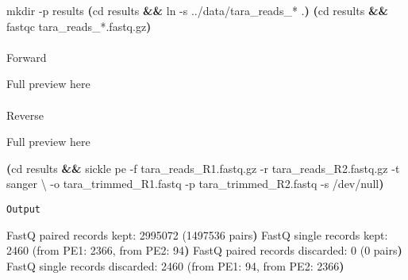 \documentclass[
  letterpaper,
  DIV=11,
  numbers=noendperiod]{scrartcl}
\makeatletter
\let\oldparagraph\paragraph
\renewcommand{\paragraph}{
    \@ifstar
      \xxxParagraphStar
      \xxxParagraphNoStar
  }
\newcommand{\xxxParagraphStar}[1]{\oldparagraph*{#1}\mbox{}}
\newcommand{\xxxParagraphNoStar}[1]{\oldparagraph{#1}\mbox{}}
\newenvironment{Shaded}{\begin{snugshade}}{\end{snugshade}}
\newcommand{\AttributeTok}[1]{\textcolor[rgb]{0.40,0.45,0.13}{#1}}
\newcommand{\BuiltInTok}[1]{\textcolor[rgb]{0.00,0.23,0.31}{#1}}
\newcommand{\DataTypeTok}[1]{\textcolor[rgb]{0.68,0.00,0.00}{#1}}
\newcommand{\ErrorTok}[1]{\textcolor[rgb]{0.68,0.00,0.00}{#1}}
\newcommand{\ExtensionTok}[1]{\textcolor[rgb]{0.00,0.23,0.31}{#1}}
\newcommand{\FunctionTok}[1]{\textcolor[rgb]{0.28,0.35,0.67}{#1}}
\newcommand{\KeywordTok}[1]{\textcolor[rgb]{0.00,0.23,0.31}{\textbf{#1}}}
\newcommand{\NormalTok}[1]{\textcolor[rgb]{0.00,0.23,0.31}{#1}}
\newcommand{\PreprocessorTok}[1]{\textcolor[rgb]{0.68,0.00,0.00}{#1}}
\makeatother
\begin{document}
\begin{Shaded}
\begin{Highlighting}[]
\FunctionTok{mkdir} \AttributeTok{{-}p}\NormalTok{ results}
\KeywordTok{(}\BuiltInTok{cd}\NormalTok{ results }\KeywordTok{\&\&} \FunctionTok{ln} \AttributeTok{{-}s}\NormalTok{ ../data/tara\_reads\_}\PreprocessorTok{*}\NormalTok{ .}\KeywordTok{)}
\KeywordTok{(}\BuiltInTok{cd}\NormalTok{ results }\KeywordTok{\&\&} \ExtensionTok{fastqc}\NormalTok{ tara\_reads\_}\PreprocessorTok{*}\NormalTok{.fastq.gz}\KeywordTok{)}
\end{Highlighting}
\end{Shaded}

\paragraph{Forward}

Full preview here

\paragraph{Reverse}

Full preview here

\begin{Shaded}
\begin{Highlighting}[]
\KeywordTok{(}\BuiltInTok{cd}\NormalTok{ results }\KeywordTok{\&\&} \ExtensionTok{sickle}\NormalTok{ pe }\AttributeTok{{-}f}\NormalTok{ tara\_reads\_R1.fastq.gz }\AttributeTok{{-}r}\NormalTok{ tara\_reads\_R2.fastq.gz }\AttributeTok{{-}t}\NormalTok{ sanger }\DataTypeTok{\textbackslash{}}
    \AttributeTok{{-}o}\NormalTok{ tara\_trimmed\_R1.fastq }\AttributeTok{{-}p}\NormalTok{ tara\_trimmed\_R2.fastq }\AttributeTok{{-}s}\NormalTok{ /dev/null}\KeywordTok{)}
\end{Highlighting}
\end{Shaded}

\texttt{Output}

\begin{Shaded}
\begin{Highlighting}[]
\ExtensionTok{FastQ}\NormalTok{ paired records kept: 2995072 }\ErrorTok{(}\ExtensionTok{1497536}\NormalTok{ pairs}\KeywordTok{)}
\ExtensionTok{FastQ}\NormalTok{ single records kept: 2460 }\ErrorTok{(}\ExtensionTok{from}\NormalTok{ PE1: 2366, from PE2: 94}\KeywordTok{)}
\ExtensionTok{FastQ}\NormalTok{ paired records discarded: 0 }\ErrorTok{(}\ExtensionTok{0}\NormalTok{ pairs}\KeywordTok{)}
\ExtensionTok{FastQ}\NormalTok{ single records discarded: 2460 }\ErrorTok{(}\ExtensionTok{from}\NormalTok{ PE1: 94, from PE2: 2366}\KeywordTok{)}
\end{Highlighting}
\end{Shaded}
\end{document}
